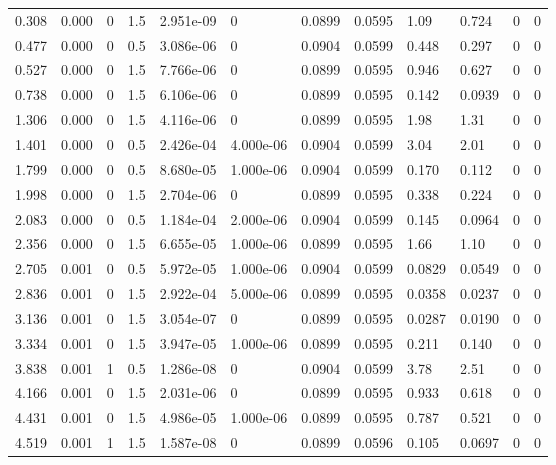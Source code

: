 \documentclass[preview]{standalone}
\begin{document}
{{\begin{tabular}{L{1.2cm}C{1.2cm} C{0.3cm}C{0.5cm} C{1.4cm}C{1.4cm} C{1.4cm}C{1.4cm} C{1.6cm}C{1.6cm} C{1.6cm}C{1.6cm}}
  0.308  &  0.000  & 0     & 1.5 &  2.951e-09  & 0  &  0.0899&   0.0595& 1.09 & 0.724   &  0 & 0  \\ 
  0.477  &  0.000  & 0     & 0.5 &  3.086e-06  & 0  &  0.0904&   0.0599& 0.448 & 0.297   &  0 & 0  \\ 
  0.527  &  0.000  & 0     & 1.5 &  7.766e-06  & 0  &  0.0899&   0.0595& 0.946 & 0.627   &  0 & 0  \\ 
  0.738  &  0.000  & 0     & 1.5 &  6.106e-06  & 0  &  0.0899&   0.0595& 0.142 & 0.0939   &  0 & 0  \\ 
  1.306  &  0.000  & 0     & 1.5 &  4.116e-06  & 0  &  0.0899&   0.0595& 1.98 & 1.31   &  0 & 0  \\ 
  1.401  &  0.000  & 0     & 0.5 &  2.426e-04  & 4.000e-06  &  0.0904&   0.0599& 3.04 & 2.01   &  0 & 0  \\ 
  1.799  &  0.000  & 0     & 0.5 &  8.680e-05  & 1.000e-06  &  0.0904&   0.0599& 0.170 & 0.112   &  0 & 0  \\ 
  1.998  &  0.000  & 0     & 1.5 &  2.704e-06  & 0  &  0.0899&   0.0595& 0.338 & 0.224   &  0 & 0  \\ 
  2.083  &  0.000  & 0     & 0.5 &  1.184e-04  & 2.000e-06  &  0.0904&   0.0599& 0.145 & 0.0964   &  0 & 0  \\ 
  2.356  &  0.000  & 0     & 1.5 &  6.655e-05  & 1.000e-06  &  0.0899&   0.0595& 1.66 & 1.10   &  0 & 0  \\ 
  2.705  &  0.001  & 0     & 0.5 &  5.972e-05  & 1.000e-06  &  0.0904&   0.0599& 0.0829 & 0.0549   &  0 & 0  \\ 
  2.836  &  0.001  & 0     & 1.5 &  2.922e-04  & 5.000e-06  &  0.0899&   0.0595& 0.0358 & 0.0237   &  0 & 0  \\ 
  3.136  &  0.001  & 0     & 1.5 &  3.054e-07  & 0  &  0.0899&   0.0595& 0.0287 & 0.0190   &  0 & 0  \\ 
  3.334  &  0.001  & 0     & 1.5 &  3.947e-05  & 1.000e-06  &  0.0899&   0.0595& 0.211 & 0.140   &  0 & 0  \\ 
  3.838  &  0.001  & 1     & 0.5 &  1.286e-08  & 0  &  0.0904&   0.0599& 3.78 & 2.51   &  0 & 0  \\ 
  4.166  &  0.001  & 0     & 1.5 &  2.031e-06  & 0  &  0.0899&   0.0595& 0.933 & 0.618   &  0 & 0  \\ 
  4.431  &  0.001  & 0     & 1.5 &  4.986e-05  & 1.000e-06  &  0.0899&   0.0595& 0.787 & 0.521   &  0 & 0  \\ 
  4.519  &  0.001  & 1     & 1.5 &  1.587e-08  & 0  &  0.0899&   0.0596& 0.105 & 0.0697   &  0 & 0  \\ 

\end{tabular}}}
\end{document}
